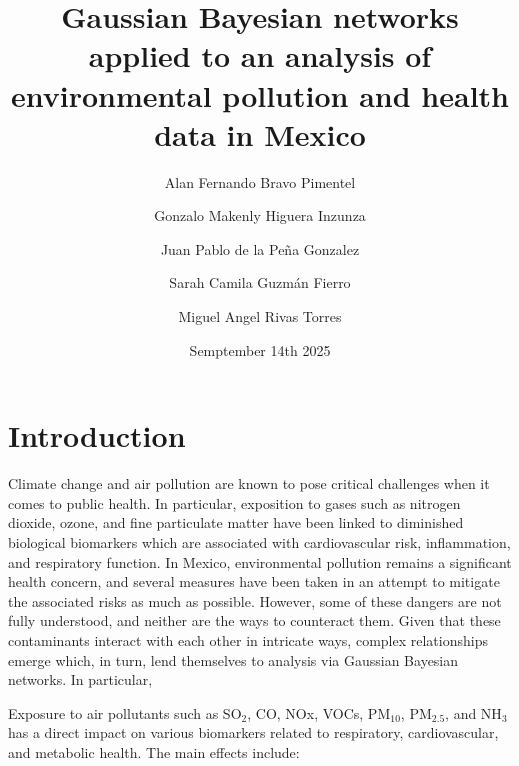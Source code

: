 \documentclass[twocolumn]{article}
\title{Gaussian Bayesian networks applied to an analysis of environmental pollution and health data in Mexico }
\author{
Alan Fernando Bravo Pimentel \and
Gonzalo Makenly Higuera Inzunza \and
Juan Pablo de la Peña Gonzalez \and
Sarah Camila Guzmán Fierro \and
Miguel Angel Rivas Torres
}
\date{Semptember 14th 2025}
\begin{document}
\maketitle

\begin{abstract}
\end{abstract}

\section{Introduction}
Climate change and air pollution are known to pose critical challenges when it comes to public health. In particular, exposition to gases such as nitrogen dioxide, ozone, and fine particulate matter have been linked to diminished biological biomarkers which are associated with cardiovascular risk, inflammation, and respiratory function. In Mexico, environmental pollution remains a significant health concern, and several measures have been taken in an attempt to mitigate the associated risks as much as possible. However, some of these dangers are not fully understood, and neither are the ways to counteract them.
Given that these contaminants interact with each other in intricate ways, complex relationships emerge which, in turn,  lend themselves to analysis via Gaussian Bayesian networks. 
In particular,

\vspace{0.5cm}

Exposure to air pollutants such as SO$_2$, CO, NOx, VOCs, PM$_{10}$, PM$_{2.5}$, and NH$_3$ has a direct impact on various biomarkers related to respiratory, cardiovascular, and metabolic health. The main effects include:
\end{document}
